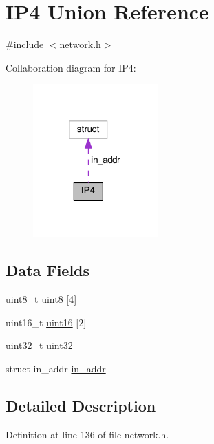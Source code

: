 \hypertarget{union_i_p4}{\section{I\+P4 Union Reference}
\label{union_i_p4}
}


{\ttfamily \#include $<$network.\+h$>$}



Collaboration diagram for I\+P4\+:
\nopagebreak
\begin{figure}[H]
\begin{center}
\leavevmode
\includegraphics[width=136pt]{d7/d5a/union_i_p4__coll__graph}
\end{center}
\end{figure}
\subsection*{Data Fields}
\begin{DoxyCompactItemize}
\item 
uint8\+\_\+t \hyperlink{union_i_p4_a73b9a57544f1edd6e2187aca636c75ef}{uint8} \mbox{[}4\mbox{]}
\item 
uint16\+\_\+t \hyperlink{union_i_p4_ac29b55876c4db8c2e69e138039fb7a8a}{uint16} \mbox{[}2\mbox{]}
\item 
uint32\+\_\+t \hyperlink{union_i_p4_a5ad776be1fb768f3399aafcd1b58b3a2}{uint32}
\item 
struct in\+\_\+addr \hyperlink{union_i_p4_a5a47f63dce37e6eb6be40f022434b1c5}{in\+\_\+addr}
\end{DoxyCompactItemize}


\subsection{Detailed Description}


Definition at line 136 of file network.\+h.



